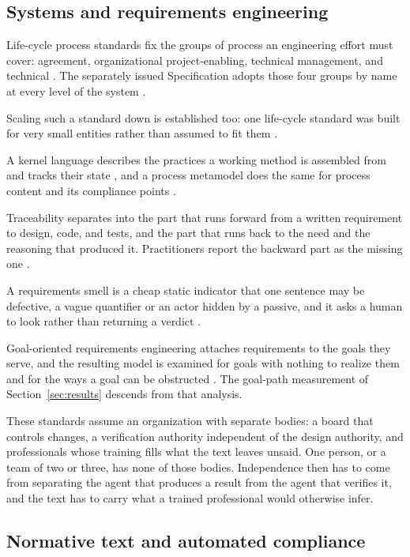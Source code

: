 \subsection{Systems and requirements engineering}

Life-cycle process standards fix the groups of process an engineering effort must cover: agreement, organizational project-enabling, technical management, and technical \citep{iso15288}. The separately issued Specification adopts those four groups by name at every level of the system \citep{pss2026}.

Scaling such a standard down is established too: one life-cycle standard was built for very small entities rather than assumed to fit them \citep{laporte2008}.

A kernel language describes the practices a working method is assembled from and tracks their state \citep{essenceomg}, and a process metamodel does the same for process content and its compliance points \citep{spem2}.

Traceability separates into the part that runs forward from a written requirement to design, code, and tests, and the part that runs back to the need and the reasoning that produced it. Practitioners report the backward part as the missing one \citep{gotel1994}.


A requirements smell is a cheap static indicator that one sentence may be defective, a vague quantifier or an actor hidden by a passive, and it asks a human to look rather than returning a verdict \citep{femmer2017}.

Goal-oriented requirements engineering attaches requirements to the goals they serve, and the resulting model is examined for goals with nothing to realize them and for the ways a goal can be obstructed \citep{vanlamsweerde2001, horkoff2017}. The goal-path measurement of Section~\ref{sec:results} descends from that analysis.

These standards assume an organization with separate bodies: a board that controls changes, a verification authority independent of the design authority, and professionals whose training fills what the text leaves unsaid. One person, or a team of two or three, has none of those bodies. Independence then has to come from separating the agent that produces a result from the agent that verifies it, and the text has to carry what a trained professional would otherwise infer.

\subsection{Normative text and automated compliance}

